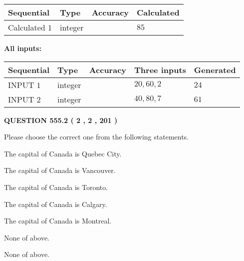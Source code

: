 \documentclass[12pt]{article}
\begin{document}
   
  
  
\noindent\begin{tabular}{|l|l|l|l|}
\hline
 Sequential & Type & Accuracy & Calculated \\ 
\hline
 
 
  Calculated $  1 $ & integer &  & 
  $ 85 $ 
 \\  \hline  
 \end{tabular}
   
   
   
   
\noindent\vspace{0.1in}\hspace{-0.08in} {\textbf{\Large{All inputs: }}}
   
   
  
  
\noindent\begin{tabular}{|l|l|l|l|l|}
\hline
 Sequential & Type & Accuracy & Three inputs & Generated \\ 
\hline
 
 
  INPUT $  1 $ & integer &  & $
 20
 , 
 60
 , 
 2
 $ & $ 24 $ 
 \\  \hline  
 
 
  INPUT $  2 $ & integer &  & $
 40
 , 
 80
 , 
 7
 $ & $ 61 $ 
 \\  \hline  
 \end{tabular}
   
   
  
\vspace{0.2in}
  
{\textbf{\Large{QUESTION
555.2 
 ( 2 , 2 , 201 )
}}}
  
  
Please choose the correct one from the following statements.
 
 
The capital of Canada is Quebec City.
 
 
The capital of Canada is Vancouver.
 
 
The capital of Canada is Toronto.
 
 
The capital of Canada is Calgary.
 
 
The capital of Canada is Montreal.
 
 
 None of above.
 
 
\noindent{}
 
 
 None of above.
 
\end{document}
